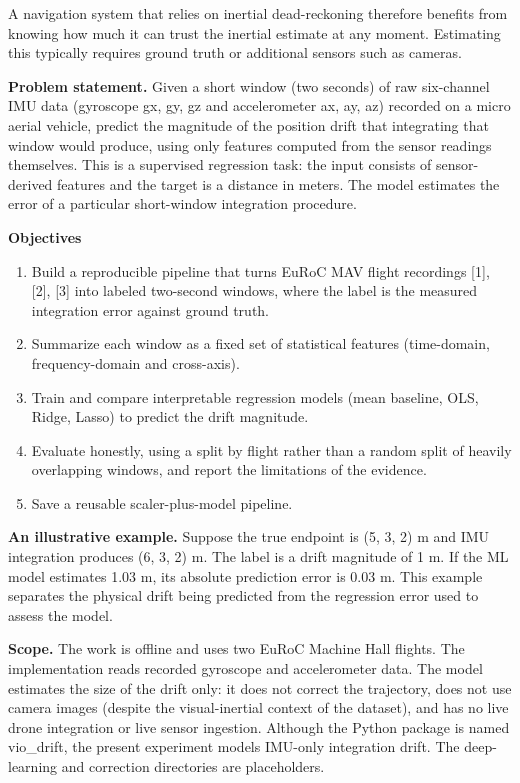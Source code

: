 \documentclass[
  11pt,
]{article}
\begin{document}
A navigation system that relies on inertial dead-reckoning therefore benefits from knowing how much it can trust the inertial estimate at any moment. Estimating this typically requires ground truth or additional sensors such as cameras.

\textbf{Problem statement.} Given a short window (two seconds) of raw six-channel IMU data (gyroscope gx, gy, gz and accelerometer ax, ay, az) recorded on a micro aerial vehicle, predict the magnitude of the position drift that integrating that window would produce, using only features computed from the sensor readings themselves. This is a supervised regression task: the input consists of sensor-derived features and the target is a distance in meters. The model estimates the error of a particular short-window integration procedure.

\textbf{Objectives}

\begin{enumerate}
\def\labelenumi{\arabic{enumi}.}
\item
  Build a reproducible pipeline that turns EuRoC MAV flight recordings {[}1{]}, {[}2{]}, {[}3{]} into labeled two-second windows, where the label is the measured integration error against ground truth.
\item
  Summarize each window as a fixed set of statistical features (time-domain, frequency-domain and cross-axis).
\item
  Train and compare interpretable regression models (mean baseline, OLS, Ridge, Lasso) to predict the drift magnitude.
\item
  Evaluate honestly, using a split by flight rather than a random split of heavily overlapping windows, and report the limitations of the evidence.
\item
  Save a reusable scaler-plus-model pipeline.
\end{enumerate}

\textbf{An illustrative example.} Suppose the true endpoint is (5, 3, 2) m and IMU integration produces (6, 3, 2) m. The label is a drift magnitude of 1 m. If the ML model estimates 1.03 m, its absolute prediction error is 0.03 m. This example separates the physical drift being predicted from the regression error used to assess the model.

\textbf{Scope.} The work is offline and uses two EuRoC Machine Hall flights. The implementation reads recorded gyroscope and accelerometer data. The model estimates the size of the drift only: it does not correct the trajectory, does not use camera images (despite the visual-inertial context of the dataset), and has no live drone integration or live sensor ingestion. Although the Python package is named vio\_drift, the present experiment models IMU-only integration drift. The deep-learning and correction directories are placeholders.
\end{document}
